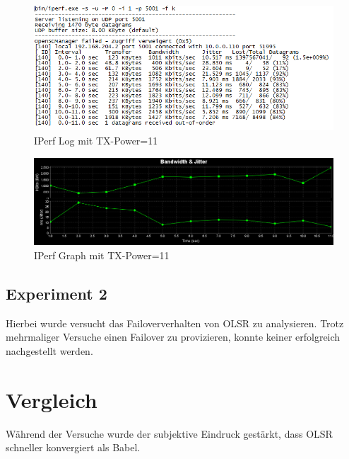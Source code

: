 \documentclass[10pt]{scrartcl}
\begin{document}
	\begin{figure}
        \centering
                \includegraphics[width=\textwidth]{img/OLSR_TX1_Protokoll}
        \caption{IPerf Log mit TX-Power=11}
        \label{img:olsr_iperf_tx11}
	\end{figure}
	
	\begin{figure}
        \centering
                \includegraphics[width=\textwidth]{img/3_UDP_OLSR_10MB}
        \caption{IPerf Graph mit TX-Power=11}
        \label{img:olsr_iperf_graph_tx11}
	\end{figure}
	
	\subsection{Experiment 2}
	Hierbei wurde versucht das Failoververhalten von OLSR zu analysieren. Trotz mehrmaliger Versuche einen Failover zu provizieren, konnte keiner erfolgreich nachgestellt werden.

\section{Vergleich}
Während der Versuche wurde der subjektive Eindruck gestärkt, dass OLSR schneller konvergiert als Babel.
\end{document}
